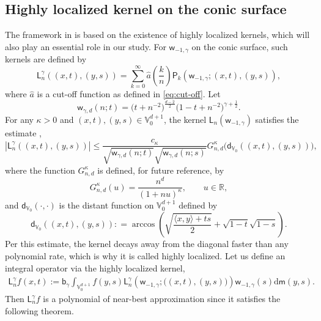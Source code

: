 \documentclass{amsart}
\theoremstyle{remark}
\def\la{{\langle}}
\def\ra{{\rangle}}
\def\d{\mathrm{d}}
\def\g{{\gamma}}
\def\k{{\kappa}}
\def\la{{\langle}}
\def\ra{{\rangle}}
\def\RR{{\mathbb R}}
\def\VV{{\mathbb V}}
\def\la{{\langle}}
\def\ra{{\rangle}}
\def\d{\mathrm{d}}
\def\sL{{\mathsf L}}
\def\sP{{\mathsf P}}
\def\sb{{\mathsf b}}
\def\sd{{\mathsf d}}
\def\sm{{\mathsf m}}
\def\sw{{\mathsf w}}
\def\g{{\gamma}}
\def\k{{\kappa}}
\def\la{{\langle}}
\def\ra{{\rangle}}
\def\RR{{\mathbb R}}
\def\VV{{\mathbb V}}
\newcommand{\wh}{\widehat}
\def\f{\frac}
\def\f{\frac}
\begin{document}
\subsection{Highly localized kernel on the conic surface} 
The framework in \cite{X21} is based on the existence of highly localized kernels, which will also play an essential
role in our study. For $\sw_{-1,\g}$ on the conic surface, such kernels are defined by
 \begin{equation} \label{def:Ln-kernel-V0} 
    \sL_n^\g \left( (x,t),(y,s)\right) = \sum_{k=0}^{\infty} \wh a \left(\frac{k}{n}\right) \sP_k(\sw_{-1,\g}; (x,t),(y,s)), 
\end{equation} 
where $\wh a$ is a cut-off function as defined in \eqref{eq:cut-off}. Let 
\begin{equation}\label{eq:w(n;t)}
     \sw_{\g,d} (n; t) =\big(t+n^{-2}\big)^{\f{d-2}{2}} \big(1-t+n^{-2}\big)^{\g+\f12}. 
\end{equation}
For any $\k > 0$ and \((x,t), (y,s) \in \VV_0^{d+1}\), the kernel $\sL_n(\sw_{-1,\g})$ satisfies the estimate \cite[Theorem 4.10]{X21},
\begin{equation}\label{V0-bound}
\left | \sL_n^\g\left( (x,t), (y,s) \right) \right|
	\le \frac{c_\kappa}{\sqrt{\sw_{\gamma,d}(n; t)} \sqrt{\sw_{\gamma,d}(n; s)}} G_{n,d}^\kappa \big( \sd_{\VV_0}((x,t), (y,s)) \big),
\end{equation}
where the function \(G_{n,d}^\kappa\) is defined, for future reference, by
\begin{equation} \label{eq:Gnd}
G_{n,d}^\kappa(u) = \frac{n^d}{(1 + n u)^\kappa}, \qquad u \in \RR,
\end{equation}
and $\sd_{\VV_0}(\cdot, \cdot)$ is the distant function on $\VV_0^{d+1}$ defined by \cite[Definiotn 4.1]{X21}
\begin{equation}\label{eq:distV0}
  \sd_{\VV_0} ((x,t), (y,s)): =  \arccos \left(\sqrt{\frac{\la x,y\ra + t s}{2}} + \sqrt{1-t}\sqrt{1-s}\right).
\end{equation}
Per this estimate, the kernel decays away from the diagonal faster than any polynomial rate, which is why it is called 
highly localized. Let us define an integral operator via the highly localized kernel,
\begin{align}\label{def:Ln-surface}
	 \sL_n^\g f(x,t) :=  \sb_\g \int_{\VV_0^{d+1}} f(y,s) \sL_n^\g \left(\sw_{-1,\g}; \big( (x,t),(y,s) \big)\right) \sw_{-1,\g}(s) \d \sm(y,s).
\end{align}
Then $\sL^\g_nf $ is a polynomial of near-best approximation since it satisfies the following theorem. 
\end{document}
